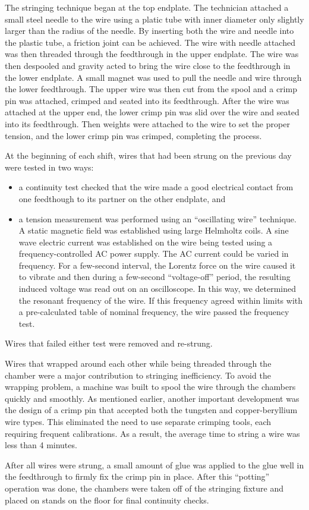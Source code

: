 The stringing technique began at the top endplate.  The technician attached a 
small steel needle to the wire using a platic tube with inner diameter only
slightly larger than the radius of the needle.  By inserting both the wire and
needle into the plastic tube, a friction joint can be achieved.  
The wire with needle attached was then threaded through the feedthrough in 
the upper endplate.  The wire was then despooled and gravity acted to bring the 
wire close to the feedthrough in the lower endplate.  A small magnet was 
used to pull the needle and wire through the lower feedthrough.  The upper wire
was then cut from the spool and a crimp pin was attached, crimped and seated into
its feedthrough.  After the wire was attached at the upper end, the lower 
crimp pin was slid over the wire and seated into its feedthrough.  Then 
weights were attached to the wire to set the 
proper tension, and the lower crimp pin was crimped, completing the process.

At the beginning of each shift, wires that had been strung on the previous day
were tested in two ways:
\begin{itemize}
\item a continuity test checked that the wire made a good electrical contact
from one feedthough to its partner on the other endplate, and
\item a tension measurement was performed using an ``oscillating wire'' technique.
A static magnetic field was established using large Helmholtz coils.  A sine
wave electric current was established on the wire being tested using a frequency-controlled 
AC power supply.  The AC current could be varied in frequency.  For a 
few-second interval, the Lorentz force on the wire caused it to vibrate and
then during a few-second ``voltage-off'' period, the resulting induced voltage
was read out on an oscilloscope.  In this way, we determined the resonant frequency
of the wire.  If this frequency agreed within limits with a pre-calculated
table of nominal frequency, the wire passed the frequency test.
\end{itemize}
Wires that failed either test were removed and re-strung.

Wires that wrapped around each other while being threaded through the chamber 
were a major contribution to stringing inefficiency. To avoid the wrapping
problem, a machine was built to spool the wire through the chambers quickly and smoothly.
As mentioned earlier, another important development was the design of a crimp pin 
that accepted both the tungsten and copper-beryllium wire types.    This 
eliminated the need to use separate crimping tools, each requiring frequent 
calibrations.  
As a result, the average time to string a wire was less than 4 minutes.

After all wires were strung,
a small amount of glue was applied to the glue well
in the feedthrough to firmly fix the crimp pin in place.  After this ``potting''
operation was done, the chambers were taken off of the stringing fixture and
placed on stands on the floor for final continuity checks.








